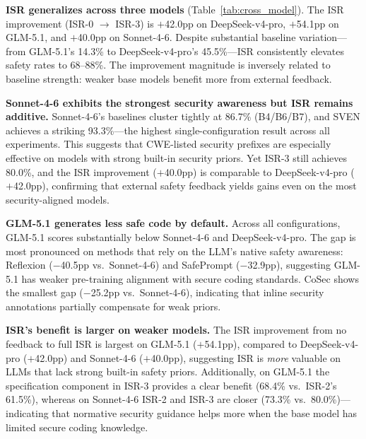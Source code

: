 \documentclass[10pt,conference]{IEEEtran}
\begin{document}
\textbf{ISR generalizes across three models} (Table~\ref{tab:cross_model}). The ISR improvement (ISR-0 $\rightarrow$ ISR-3) is $+$42.0pp on DeepSeek-v4-pro, $+$54.1pp on GLM-5.1, and $+$40.0pp on Sonnet-4-6. Despite substantial baseline variation---from GLM-5.1's 14.3\% to DeepSeek-v4-pro's 45.5\%---ISR consistently elevates safety rates to 68--88\%. The improvement magnitude is inversely related to baseline strength: weaker base models benefit more from external feedback.

\textbf{Sonnet-4-6 exhibits the strongest security awareness but ISR remains additive.} Sonnet-4-6's baselines cluster tightly at 86.7\% (B4/B6/B7), and SVEN achieves a striking 93.3\%---the highest single-configuration result across all experiments. This suggests that CWE-listed security prefixes are especially effective on models with strong built-in security priors. Yet ISR-3 still achieves 80.0\%, and the ISR improvement ($+$40.0pp) is comparable to DeepSeek-v4-pro ($+$42.0pp), confirming that external safety feedback yields gains even on the most security-aligned models.

\textbf{GLM-5.1 generates less safe code by default.} Across all configurations, GLM-5.1 scores substantially below Sonnet-4-6 and DeepSeek-v4-pro. The gap is most pronounced on methods that rely on the LLM's native safety awareness: Reflexion ($-$40.5pp vs.\ Sonnet-4-6) and SafePrompt ($-$32.9pp), suggesting GLM-5.1 has weaker pre-training alignment with secure coding standards. CoSec shows the smallest gap ($-$25.2pp vs.\ Sonnet-4-6), indicating that inline security annotations partially compensate for weak priors.

\textbf{ISR's benefit is larger on weaker models.} The ISR improvement from no feedback to full ISR is largest on GLM-5.1 ($+$54.1pp), compared to DeepSeek-v4-pro ($+$42.0pp) and Sonnet-4-6 ($+$40.0pp), suggesting ISR is \textit{more} valuable on LLMs that lack strong built-in safety priors. Additionally, on GLM-5.1 the specification component in ISR-3 provides a clear benefit (68.4\% vs.\ ISR-2's 61.5\%), whereas on Sonnet-4-6 ISR-2 and ISR-3 are closer (73.3\% vs.\ 80.0\%)---indicating that normative security guidance helps more when the base model has limited secure coding knowledge.
\end{document}

